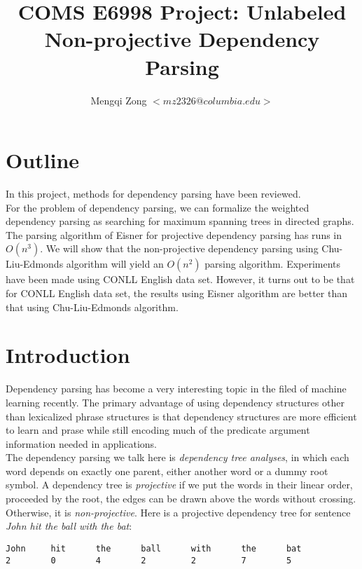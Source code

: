\documentclass[12pt]{article}
\title{COMS E6998 Project: Unlabeled Non-projective Dependency Parsing}
\author{Mengqi Zong $<mz2326@columbia.edu>$}
\begin{document}
\maketitle

\setlength{\parindent}{0in}

\section{Outline}


In this project,  methods for dependency parsing have been reviewed. \\

For the problem of dependency parsing, we can formalize the weighted dependency parsing as searching for maximum spanning trees in directed graphs. The parsing algorithm of Eisner for projective dependency parsing has runs in $O(n^3)$. We will show that the non-projective dependency parsing using Chu-Liu-Edmonds algorithm will yield an $O(n^2)$ parsing algorithm. Experiments have been made using CONLL English data set. However, it turns out to be that for CONLL English data set, the results using Eisner algorithm are better than that using Chu-Liu-Edmonds algorithm.

\section{Introduction}

Dependency parsing has become a very interesting topic in the filed of machine learning recently. The primary advantage of using dependency structures other than lexicalized phrase structures is that dependency structures are more efficient to learn and prase while still encoding much of the predicate argument information needed in applications. \\

The dependency parsing we talk here is \emph {dependency tree analyses}, in which each word depends on exactly one parent, either another word or a dummy root symbol. A dependency tree is \emph {projective} if we put  the words in their linear order, proceeded by the root, the edges can be drawn above the words without crossing. Otherwise, it is \emph {non-projective}. Here is a projective dependency tree for sentence \emph {John hit the ball with the bat}:

\begin{verbatim}
John     hit      the      ball      with      the      bat
2        0        4        2         2         7        5 
\end{verbatim}
\end{document}
